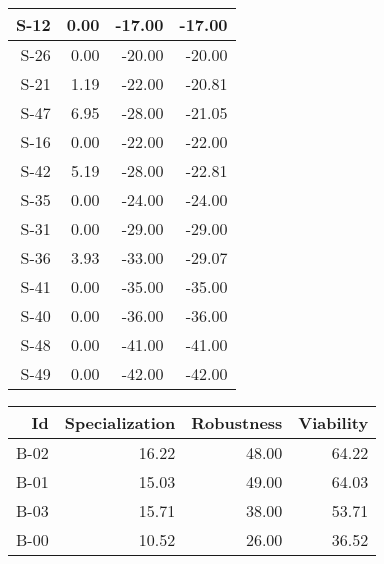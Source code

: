 \begin{tabular}{ | r | r | r | r | }
    \hline
                  S-12  &            0.00  &          -17.00  &          -17.00  \\
    \hline
                  S-26  &            0.00  &          -20.00  &          -20.00  \\
    \hline
                  S-21  &            1.19  &          -22.00  &          -20.81  \\
    \hline
                  S-47  &            6.95  &          -28.00  &          -21.05  \\
    \hline
                  S-16  &            0.00  &          -22.00  &          -22.00  \\
    \hline
                  S-42  &            5.19  &          -28.00  &          -22.81  \\
    \hline
                  S-35  &            0.00  &          -24.00  &          -24.00  \\
    \hline
                  S-31  &            0.00  &          -29.00  &          -29.00  \\
    \hline
                  S-36  &            3.93  &          -33.00  &          -29.07  \\
    \hline
                  S-41  &            0.00  &          -35.00  &          -35.00  \\
    \hline
                  S-40  &            0.00  &          -36.00  &          -36.00  \\
    \hline
                  S-48  &            0.00  &          -41.00  &          -41.00  \\
    \hline
                  S-49  &            0.00  &          -42.00  &          -42.00  \\
    \hline
\end{tabular}


\begin{tabular}{ | r | r | r | r | }
    \hline
                    Id  &  Specialization  &      Robustness  &       Viability  \\
    \hline
    \hline
                  B-02  &           16.22  &           48.00  &           64.22  \\
    \hline
                  B-01  &           15.03  &           49.00  &           64.03  \\
    \hline
                  B-03  &           15.71  &           38.00  &           53.71  \\
    \hline
                  B-00  &           10.52  &           26.00  &           36.52  \\
    \hline
\end{tabular}


